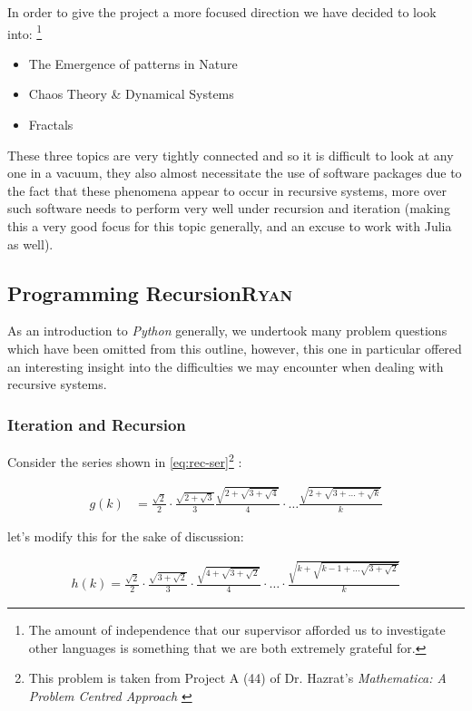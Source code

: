 \documentclass[11pt]{article}
\begin{document}
In order to give the project a more focused direction we have decided to look into: \footnote{The amount of independence that our supervisor afforded us to
investigate other languages is something that we are both extremely grateful for.}

\begin{itemize}
\item The Emergence of patterns in Nature
\item Chaos Theory \& Dynamical Systems
\item Fractals
\end{itemize}

These three topics are very tightly connected and so it is difficult to look at
any one in a vacuum, they also almost necessitate the use of software packages
due to the fact that these phenomena appear to occur in recursive systems, more
over such software needs to perform very well under recursion and iteration
(making this a very good focus for this topic generally, and an excuse to work
with Julia as well).

\subsection{Programming Recursion\hfill{}\textsc{Ryan}}
\label{sec:orgae53822}
As an introduction to \emph{Python} generally, we undertook many problem questions which have been omitted from this outline, however, this one in particular offered an interesting insight into the difficulties we may encounter when dealing with recursive systems.
\subsubsection{Iteration and Recursion}
\label{series-and-recursion}
Consider the series shown in \eqref{eq:rec-ser}\footnote{This problem is taken from Project A (44) of Dr. Hazrat's \emph{Mathematica: A Problem Centred Approach} \cite{hazratMathematicaProblemCenteredApproach2015}} :

\begin{align}
    g\left( k \right) &=  \frac{\sqrt{2} }{2} \cdot   \frac{\sqrt{2+  \sqrt{3}}  }{3} \frac{\sqrt{2 +  \sqrt{3 +  \sqrt{4} } } }{4} \cdot  \ldots \frac{\sqrt{2 +  \sqrt{3 +  \ldots +  \sqrt{k} } } }{k} \label{eq:rec-ser}
\end{align}

let's modify this for the sake of discussion:

\begin{align}
h\left( k \right) = \frac{\sqrt{2}  }{2} \cdot  \frac{\sqrt{3 +  \sqrt{2} } }{3} \cdot  \frac{\sqrt{4 +  \sqrt{3 +  \sqrt{2} } } }{4} \cdot  \ldots \cdot  \frac{\sqrt{k +  \sqrt{k - 1 +  \ldots \sqrt{3 + \sqrt{2}  } } } }{k} \label{eq:rec-ser-mod}
\end{align}
\end{document}
